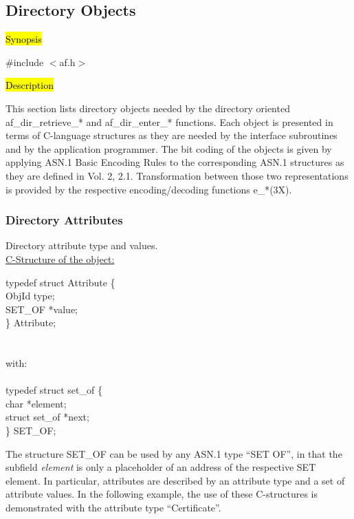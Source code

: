 \subsection{Directory Objects}
\label{af-dirobj}

\hl{Synopsis}

\#include $<$af.h$>$

\hl{Description}
     
This section lists directory objects needed by the
directory oriented af\_dir\_retrieve\_* and af\_dir\_enter\_* functions.
Each object is presented in terms of C-language structures
as they are needed by the interface subroutines and
by the application programmer.
The bit coding of the objects is given by applying
ASN.1 Basic Encoding Rules to the corresponding ASN.1 structures as they
are defined in Vol. 2, 2.1. Transformation between those two representations
is provided by the respective encoding/decoding functions e\_*(3X).

\subsubsection{Directory Attributes}
Directory attribute type and values. \\
\underline{C-Structure of the object:}

{\small
\btab
\1      typedef struct Attribute \{ \\
\2              ObjId \2   type; \\
\2              SET\_OF \2      *value; \\
\1       \} Attribute; \\ \\ \\
with:   \\ \\
\1      typedef struct set\_of \{ \\
\2              char  \2          *element; \\
\2              struct set\_of \2 *next; \\
\1      \} SET\_OF; \\
\etab
}

The structure SET\_OF can be used by any ASN.1 type ``SET OF'',
in that the subfield {\em *element} is only a placeholder
of an address of the respective SET element.
In particular, attributes are described by an attribute type
and a set of attribute values. In the following example,
the use of these C-structures is demonstrated with
the attribute type ``Certificate''.

